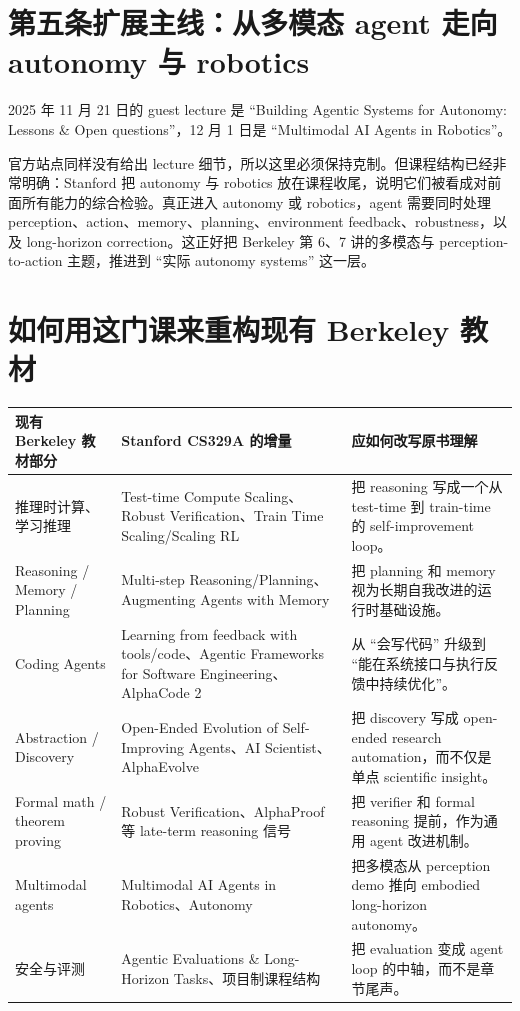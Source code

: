 \section{第五条扩展主线：从多模态 agent 走向 autonomy 与 robotics}

2025 年 11 月 21 日的 guest lecture 是 ``Building Agentic Systems for Autonomy: Lessons \& Open questions''，12 月 1 日是 ``Multimodal AI Agents in Robotics''。

官方站点同样没有给出 lecture 细节，所以这里必须保持克制。但课程结构已经非常明确：Stanford 把 autonomy 与 robotics 放在课程收尾，说明它们被看成对前面所有能力的综合检验。真正进入 autonomy 或 robotics，agent 需要同时处理 perception、action、memory、planning、environment feedback、robustness，以及 long-horizon correction。这正好把 Berkeley 第 6、7 讲的多模态与 perception-to-action 主题，推进到 ``实际 autonomy systems'' 这一层。

\section{如何用这门课来重构现有 Berkeley 教材}

\begin{longtable}{p{}p{}p{}}
\toprule
现有 Berkeley 教材部分 & Stanford CS329A 的增量 & 应如何改写原书理解 \\
\midrule
\endhead
推理时计算、学习推理 & Test-time Compute Scaling、Robust Verification、Train Time Scaling/Scaling RL & 把 reasoning 写成一个从 test-time 到 train-time 的 self-improvement loop。 \\
Reasoning / Memory / Planning & Multi-step Reasoning/Planning、Augmenting Agents with Memory & 把 planning 和 memory 视为长期自我改进的运行时基础设施。 \\
Coding Agents & Learning from feedback with tools/code、Agentic Frameworks for Software Engineering、AlphaCode 2 & 从 ``会写代码'' 升级到 ``能在系统接口与执行反馈中持续优化''。 \\
Abstraction / Discovery & Open-Ended Evolution of Self-Improving Agents、AI Scientist、AlphaEvolve & 把 discovery 写成 open-ended research automation，而不仅是单点 scientific insight。 \\
Formal math / theorem proving & Robust Verification、AlphaProof 等 late-term reasoning 信号 & 把 verifier 和 formal reasoning 提前，作为通用 agent 改进机制。 \\
Multimodal agents & Multimodal AI Agents in Robotics、Autonomy & 把多模态从 perception demo 推向 embodied long-horizon autonomy。 \\
安全与评测 & Agentic Evaluations \& Long-Horizon Tasks、项目制课程结构 & 把 evaluation 变成 agent loop 的中轴，而不是章节尾声。 \\
\bottomrule
\end{longtable}

